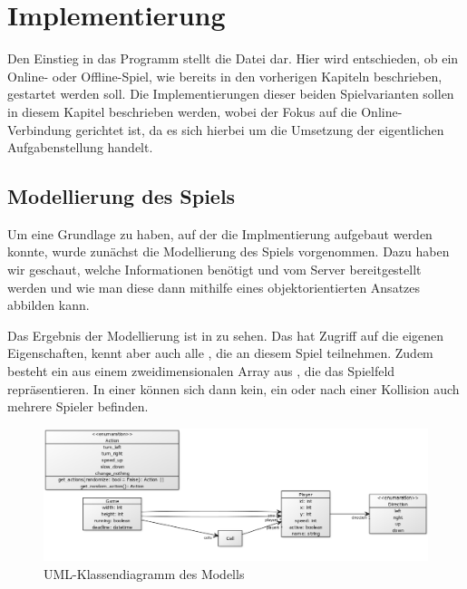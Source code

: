 \chapter{Implementierung}
\label{ch:implementierung}

Den Einstieg in das Programm stellt die Datei  dar.
Hier wird entschieden, ob ein Online- oder Offline-Spiel, wie bereits in den vorherigen Kapiteln beschrieben, gestartet
werden soll.
Die Implementierungen dieser beiden Spielvarianten sollen in diesem Kapitel beschrieben werden, wobei der Fokus auf
die Online-Verbindung gerichtet ist, da es sich hierbei um die Umsetzung der eigentlichen Aufgabenstellung handelt.

\section{Modellierung des Spiels}
\label{sec:modellierung}

Um eine Grundlage zu haben, auf der die Implmentierung aufgebaut werden konnte, wurde zunächst die Modellierung des
Spiels vorgenommen.
Dazu haben wir geschaut, welche Informationen benötigt und vom Server bereitgestellt werden und wie man diese dann
mithilfe eines objektorientierten Ansatzes abbilden kann.

Das Ergebnis der Modellierung ist in  zu sehen.
Das  hat Zugriff auf die eigenen Eigenschaften, kennt aber auch alle , die an diesem Spiel
teilnehmen.
Zudem besteht ein  aus einem zweidimensionalen Array aus , die das Spielfeld repräsentieren.
In einer  können sich dann kein, ein oder nach einer Kollision auch mehrere Spieler befinden.

\begin{figure}[htb]
\centering
\includegraphics[width=\textwidth]{Bilder/Klassendiagramm_Modellierung.png}
\caption{UML-Klassendiagramm des Modells}
\label{fig:klassendiagramm-modell}
\end{figure}

